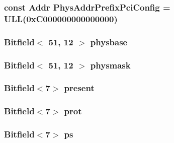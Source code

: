 \label{namespaceX86ISA_a6e6995725a6652599b0ea37948213257}
\hypertarget{namespaceX86ISA_a384097e1e4d30dd3d5e988b21511cb1f}{
\subsubsection[{PhysAddrPrefixPciConfig}]{\setlength{\rightskip}{0pt plus 5cm}const {\bf Addr} {\bf PhysAddrPrefixPciConfig} = ULL(0xC000000000000000)}}
\label{namespaceX86ISA_a384097e1e4d30dd3d5e988b21511cb1f}
\hypertarget{namespaceX86ISA_aa5bae97e6709df9ef51fef72b5c163de}{
\subsubsection[{physbase}]{\setlength{\rightskip}{0pt plus 5cm}Bitfield$<$ 51, 12 $>$ {\bf physbase}}}
\label{namespaceX86ISA_aa5bae97e6709df9ef51fef72b5c163de}
\hypertarget{namespaceX86ISA_a1af18e13c01770d0172b42eaadc445ac}{
\subsubsection[{physmask}]{\setlength{\rightskip}{0pt plus 5cm}Bitfield$<$ 51, 12 $>$ {\bf physmask}}}
\label{namespaceX86ISA_a1af18e13c01770d0172b42eaadc445ac}
\hypertarget{namespaceX86ISA_a2c4bc7438a48bd4bbdd7ed9b629a6ec6}{
\subsubsection[{present}]{\setlength{\rightskip}{0pt plus 5cm}Bitfield$<$7$>$ {\bf present}}}
\label{namespaceX86ISA_a2c4bc7438a48bd4bbdd7ed9b629a6ec6}
\hypertarget{namespaceX86ISA_aeebbde702952c30a09bf3e8d01fca3bf}{
\subsubsection[{prot}]{\setlength{\rightskip}{0pt plus 5cm}Bitfield$<$7$>$ {\bf prot}}}
\label{namespaceX86ISA_aeebbde702952c30a09bf3e8d01fca3bf}
\hypertarget{namespaceX86ISA_a5968ec061eaa50b53d7c0057cdf1a587}{
\subsubsection[{ps}]{\setlength{\rightskip}{0pt plus 5cm}Bitfield$<$7$>$ {\bf ps}}}
